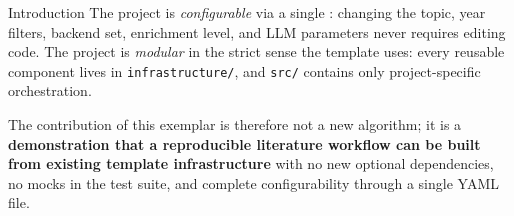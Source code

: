 \documentclass[
  ignorenonframetext,
]{beamer}
\begin{document}
\begin{frame}{Introduction}
The project is \emph{configurable} via a single
: changing the topic, year filters,
backend set, enrichment level, and LLM parameters never requires editing
code. The project is \emph{modular} in the strict sense the template
uses: every reusable component lives in \texttt{infrastructure/}, and
\texttt{src/} contains only project-specific orchestration.

The contribution of this exemplar is therefore not a new algorithm; it
is a \textbf{demonstration that a reproducible literature workflow can
be built from existing template infrastructure} with no new optional
dependencies, no mocks in the test suite, and complete configurability
through a single YAML file.
\end{frame}
\end{document}
